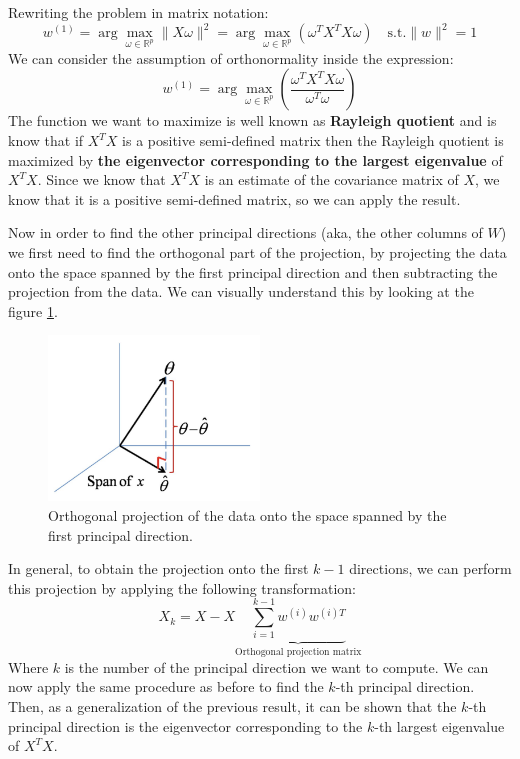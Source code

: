 Rewriting the problem in matrix notation:
\[
    w^{(1)} = \arg \max_{\omega \in \mathbb{R}^p} \|X\omega\|^2 = \arg \max_{\omega \in \mathbb{R}^p} \left(\omega^T X^T X \omega\right)\quad \text{s.t.} \|w\|^2 = 1
\]
We can consider the assumption of orthonormality inside the expression:
\[
    w^{(1)} = \arg \max_{\omega \in \mathbb{R}^p} \left(\frac{\omega^T X^T X \omega}{\omega^T \omega}\right) %
\]
The function we want to maximize is well known as \textbf{Rayleigh quotient} and is know that if $X^T X$ is a positive semi-defined matrix then the Rayleigh quotient is maximized by \textbf{the eigenvector corresponding to the largest eigenvalue} of $X^T X$.
Since we know that $X^T X$ is an estimate of the covariance matrix of $X$, we know that it is a positive semi-defined matrix, so we can apply the result.

Now in order to find the other principal directions (aka, the other columns of $W$) we first need to find the orthogonal part of the projection, by projecting the data onto the space spanned by the first principal direction and then subtracting the projection from the data. We can visually understand this by looking at the figure \ref{fig:orthogonal_projection}.

\begin{figure}
    \centering
    \includegraphics[width=0.5\textwidth]{./figures/chapter_7/orthogonal_projection.png}
    \caption{Orthogonal projection of the data onto the space spanned by the first principal direction.}
    \label{fig:orthogonal_projection}
\end{figure}

In general, to obtain the projection onto the first $k-1$ directions, we can perform this projection by applying the following transformation:
\[
    X_k = X - X \underbrace{\sum_{i=1}^{k-1} w^{(i)} w^{(i)T}}_{\text{Orthogonal projection matrix}}
\]
Where $k$ is the number of the principal direction we want to compute.  We can now apply the same procedure as before to find the $k$-th principal direction. Then, as a generalization of the previous result, it can be shown that the $k$-th principal direction is the eigenvector corresponding to the $k$-th largest eigenvalue of $X^T X$.

